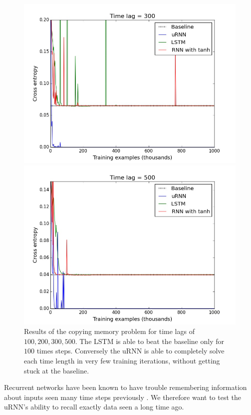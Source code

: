 \documentclass{article} %
\begin{document}
\begin{figure}[t!]
\begin{minipage}[b]{0.5\linewidth}
    \includegraphics[scale=0.25]{figures/memory_300.jpeg}
  \end{minipage}%
  \begin{minipage}[b]{0.5\linewidth}
    \includegraphics[scale=0.25]{figures/memory_500.jpeg}
  \end{minipage} 
  \caption{Results of the copying memory problem for time lags of $100, 200, 300, 500$. 
   The LSTM is able to beat the baseline only for $100$ times steps. Conversely the uRNN 
    is able to completely solve each time length in very few training iterations,
    without getting stuck at the baseline.}
\end{figure}

Recurrent networks have been known to have trouble remembering information about inputs seen
many time steps previously \citep{Yoshua94, Pascanu2013}. 
We therefore want to test the uRNN's ability to recall exactly data seen a long time ago.
\end{document}
